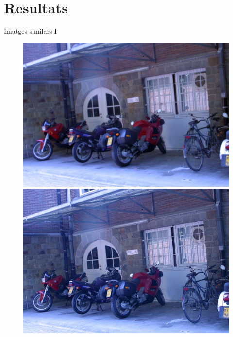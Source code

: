 \documentclass[xcolor=table, 11pt]{beamer}
\newcommand\tz{\fontsize{13}{15.6}\selectfont}
\begin{document}
\section{Resultats}

	\begin{frame}{Imatges similars I}
		\tz
		\begin{figure}[!htb]
				\includegraphics[width=\linewidth]{images/experiments/motos3}
			\endminipage
			\hspace*{0.2cm}
				\includegraphics[width=\linewidth]{images/experiments/motos1}
			\endminipage


\end{figure}
\end{frame}
\end{document}
